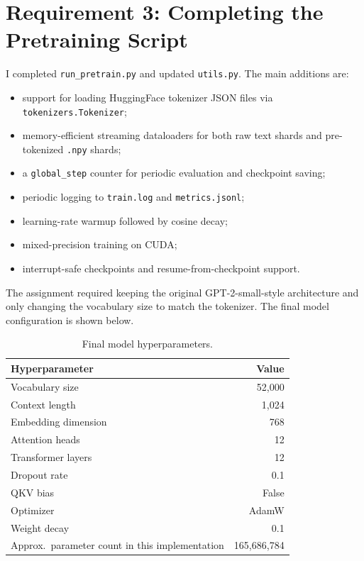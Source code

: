 \documentclass[11pt]{article}
\begin{document}
\section{Requirement 3: Completing the Pretraining Script}
I completed \texttt{run\_pretrain.py} and updated \texttt{utils.py}. The main additions are:
\begin{itemize}[leftmargin=1.5em]
  \item support for loading HuggingFace tokenizer JSON files via \texttt{tokenizers.Tokenizer};
  \item memory-efficient streaming dataloaders for both raw text shards and pre-tokenized \texttt{.npy} shards;
  \item a \texttt{global\_step} counter for periodic evaluation and checkpoint saving;
  \item periodic logging to \texttt{train.log} and \texttt{metrics.jsonl};
  \item learning-rate warmup followed by cosine decay;
  \item mixed-precision training on CUDA;
  \item interrupt-safe checkpoints and resume-from-checkpoint support.
\end{itemize}

The assignment required keeping the original GPT-2-small-style architecture and only changing the vocabulary size to match the tokenizer. The final model configuration is shown below.

\begin{table}[H]
\centering
\begin{tabular}{lr}
\toprule
Hyperparameter & Value \\
\midrule
Vocabulary size & 52,000 \\
Context length & 1,024 \\
Embedding dimension & 768 \\
Attention heads & 12 \\
Transformer layers & 12 \\
Dropout rate & 0.1 \\
QKV bias & False \\
Optimizer & AdamW \\
Weight decay & 0.1 \\
Approx.\ parameter count in this implementation & 165,686,784 \\
\bottomrule
\end{tabular}
\caption{Final model hyperparameters.}
\end{table}
\end{document}

